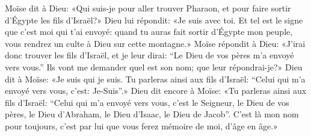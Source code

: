 Moïse dit à Dieu: «Qui suis-je pour aller trouver Pharaon,
	et pour faire sortir d’Égypte les fils d’Israël?»
Dieu lui répondit: «Je suis avec toi.
Et tel est le signe que c’est moi qui t’ai envoyé:
	quand tu auras fait sortir d’Égypte mon peuple,
	vous rendrez un culte à Dieu sur cette montagne.»
Moïse répondit à Dieu:
	«J’irai donc trouver les fils d’Israël, et je leur dirai:
	“Le Dieu de vos pères m’a envoyé vers vous.”
Ils vont me demander quel est son nom; que leur répondrai-je?»
Dieu dit à Moïse: «Je suis qui je suis.
Tu parleras ainsi aux fils d’Israël:
	“Celui qui m’a envoyé vers vous, c’est: Je-Suis”.»
Dieu dit encore à Moïse: «Tu parleras ainsi aux fils d’Israël:
	“Celui qui m’a envoyé vers vous, c’est le Seigneur, le Dieu de vos pères,
	le Dieu d’Abraham, le Dieu d’Isaac, le Dieu de Jacob”.
C’est là mon nom pour toujours,
	c’est par lui que vous ferez mémoire de moi, d’âge en âge.»
